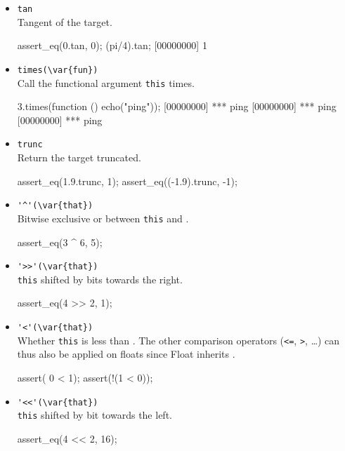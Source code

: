 \begin{itemize}
\item \lstinline|tan|\\
  Tangent of the target.
\begin{urbiscript}[firstnumber=last]
assert_eq(0.tan, 0);
(pi/4).tan;
[00000000] 1
\end{urbiscript}

\item \lstinline|times(\var{fun})|\\
  Call the functional argument  \lstinline|this| times.

\begin{urbiscript}[firstnumber=last]
3.times(function () { echo("ping")});
[00000000] *** ping
[00000000] *** ping
[00000000] *** ping
\end{urbiscript}

\item \lstinline|trunc|\\
  Return the target truncated.
\begin{urbiscript}[firstnumber=last]
assert_eq(1.9.trunc, 1);
assert_eq((-1.9).trunc, -1);
\end{urbiscript}

\item \lstinline|'^'(\var{that})|\\
  Bitwise exclusive or between \lstinline|this| and .
\begin{urbiscript}[firstnumber=last]
assert_eq(3 ^ 6, 5);
\end{urbiscript}

\item \lstinline|'>>'(\var{that})|\\%
  \lstinline|this| shifted by  bits towards the right.
\begin{urbiscript}[firstnumber=last]
assert_eq(4 >> 2, 1);
\end{urbiscript}

\item \lstinline|'<'(\var{that})|\\
  Whether \lstinline|this| is less than . The other comparison
  operators (\lstinline|<=|, \lstinline|>|, \ldots) can thus also be
  applied on floats since Float inherits .
\begin{urbiscript}[firstnumber=last]
assert(  0 < 1);
assert(!(1 < 0));
\end{urbiscript}

\item \lstinline|'<<'(\var{that})|\\
  \lstinline|this| shifted by  bit towards the left.
\begin{urbiscript}[firstnumber=last]
assert_eq(4 << 2, 16);
\end{urbiscript}


\end{itemize}
